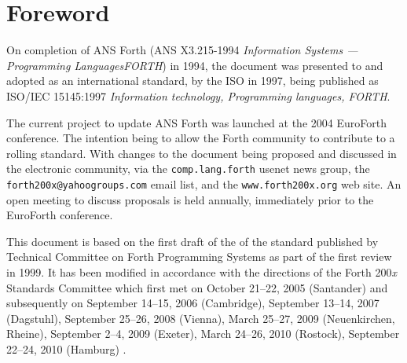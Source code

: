 \chapter*{Foreword}
\label{foreword}

On completion of ANS Forth (ANS X3.215-1994 \emph{Information Systems
--- Programming Languages\linebreak FORTH}) in 1994, the document was presented
to and adopted as an international standard, by the ISO in 1997, being
published as ISO/IEC 15145:1997 \emph{Information technology,
Programming languages, FORTH}.

The current project to update ANS Forth was launched at the 2004
EuroForth conference.  The intention being to allow the Forth community
to contribute to a rolling standard.  With changes to the document
being proposed and discussed in the electronic community, via the
\texttt{comp.lang.forth} usenet news group, the
\texttt{forth200x@yahoogroups.com} email list, and the
\texttt{www.forth200x.org} web site.  An open meeting to discuss
proposals is held annually, immediately prior to the EuroForth
conference.

This document is based on the first draft of the of the standard
published by Technical Committee on Forth Programming Systems as part
of the first review in 1999. It has been modified in accordance with
the directions of the Forth 200\emph{x} Standards Committee which first
met on October 21--22, 2005 (Santander) and subsequently on
September 14--15, 2006 (Cambridge),
September 13--14, 2007 (Dagstuhl),
September 25--26, 2008 (Vienna),
March 25--27, 2009 (Neuenkirchen, Rheine),
September 2--4, 2009 (Exeter),
March 24--26, 2010 (Rostock),
September 22--24, 2010 (Hamburg)%
.
